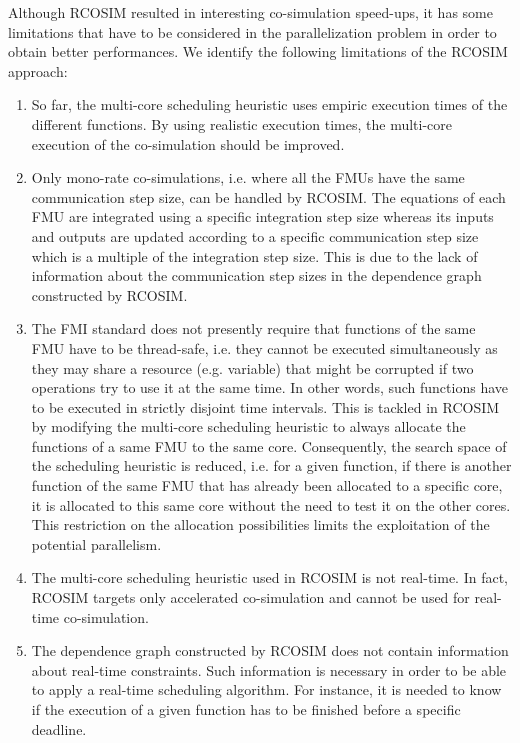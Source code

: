 Although RCOSIM resulted in interesting co-simulation speed-ups, it has some limitations that have to be considered in the parallelization problem in order to obtain better performances. We identify the following limitations of the RCOSIM approach:

\begin{enumerate}

\item So far, the multi-core scheduling heuristic uses empiric execution times of the different functions. By using realistic execution times, the multi-core execution of the co-simulation should be improved.

\item Only mono-rate co-simulations, i.e. where all the FMUs have the same communication step size, can be handled by RCOSIM. The equations of each FMU are integrated using a specific integration step size whereas its inputs and outputs are updated according to a specific communication step size which is a multiple of the integration step size. This is due to the lack of information about the communication step sizes in the dependence graph constructed by RCOSIM.

\item The FMI standard does not presently require that functions of the same FMU have to be thread-safe, i.e. they cannot be executed simultaneously as they may share a resource (e.g. variable) that might be corrupted if two operations try to use it at the same time. In other words, such functions have to be executed in strictly disjoint time intervals. This is tackled in RCOSIM by modifying the multi-core scheduling heuristic to always allocate the functions of a same FMU to the same core. Consequently, the search space of the scheduling heuristic is reduced, i.e. for a given function, if there is another function of the same FMU that has already been allocated to a specific core, it is allocated to this same core without the need to test it on the other cores. This restriction on the allocation possibilities limits the exploitation of the potential parallelism.

\item The multi-core scheduling heuristic used in RCOSIM is not real-time. In fact, RCOSIM targets only accelerated co-simulation and cannot be used for real-time co-simulation.

\item The dependence graph constructed by RCOSIM does not contain information about real-time constraints. Such information is necessary in order to be able to apply a real-time scheduling algorithm. For instance, it is needed to know if the execution of a given function has to be finished before a specific deadline.

\end{enumerate} 

